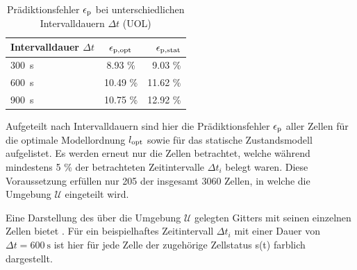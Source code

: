 \begin{table}[!h]
	\centering
	\caption{Prädiktionsfehler $\epsilon_{\mathrm{p}}$ bei unterschiedlichen Intervalldauern $\Delta t$ (UOL)}\label{tab.Prädiktionsfehler uol_binary}
	\vspace*{-3mm}
	\begin{tabular}{lcr}
		\toprule
		Intervalldauer $\Delta t$		& $\epsilon_{\mathrm{p,opt}}$	 & $\epsilon_{\mathrm{p,stat}}$          \\
		\midrule
		\SI{300}{\second}	& 8.93 \%         & 9.03 \%  \\
		\rowcolor{Snow2}
		\SI{600}{\second} 	& 10.49 \%        & 11.62 \% \\
		\SI{900}{\second}			& 10.75 \%      & 12.92 \% \\
		\bottomrule
	\end{tabular} 
\end{table}


Aufgeteilt nach Intervalldauern sind hier die Prädiktionsfehler $\epsilon_{\mathrm{p}}$ aller Zellen für die optimale Modellordnung $l_{\mathrm{opt}}$ sowie für das statische Zustandsmodell aufgelistet. Es werden erneut nur die Zellen betrachtet, welche während mindestens 5 \% der betrachteten Zeitintervalle $\Delta t_i$ belegt waren. Diese Voraussetzung erfüllen nur 205 der insgesamt 3060 Zellen, in welche die Umgebung $\mathcal{U}$ eingeteilt wird.

Eine Darstellung des über die Umgebung $\mathcal{U}$ gelegten Gitters mit seinen einzelnen Zellen bietet . Für ein beispielhaftes Zeitintervall $\Delta t_i$ mit einer Dauer von $\Delta t = \SI{600}{\second}$ ist hier für jede Zelle der zugehörige Zellstatus s(t) farblich dargestellt.



